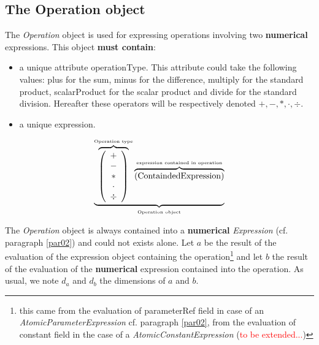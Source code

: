 \documentclass[11pt]{amsart}
\begin{document}
\subsection{The Operation object}\label{par02_02}
The {\it Operation} object is used for expressing operations involving two {\bf numerical} expressions. This object {\bf must contain}:
\begin{itemize}
\item a unique attribute operationType. This attribute could take the following values: plus for the sum, minus for the difference, multiply for the standard product, scalarProduct for the scalar product and divide for the standard division. Hereafter these operators will be respectively denoted $+,-,\ast,\cdot, \div$. 
\item a unique expression.
\end{itemize}
\begin{equation}\label{OperationEquation}
\underbrace{ \overbrace{\left( \begin{array}{c} + \\ - \\ \ast  \\ \cdot \\ \div   \end{array} \right) }^{\mbox{\tiny Operation type}}
 \overbrace{    \left( \mbox{ContaindedExpression}\right) }^{\mbox{\tiny expression contained in operation}}   }_{\mbox{\tiny Operation object}}
\end{equation}

The {\it Operation} object is always contained into a {\bf numerical} {\it Expression} (cf. paragraph \ref{par02}) and could not exists alone.
Let $a$ be the result of the evaluation of the expression object containing the operation\footnote{this came from the evaluation of parameterRef field in case of an {\it AtomicParameterExpression} cf. paragraph \ref{par02}, from the evaluation of constant field in the case of a {\it AtomicConstantExpression} (\textcolor{red}{to be extended...})} and let $b$ the result of the evaluation of the {\bf numerical} expression contained into the operation. As usual, we note $d_a$ and $d_b$ the dimensions of $a$ and $b$.\\
\end{document}
